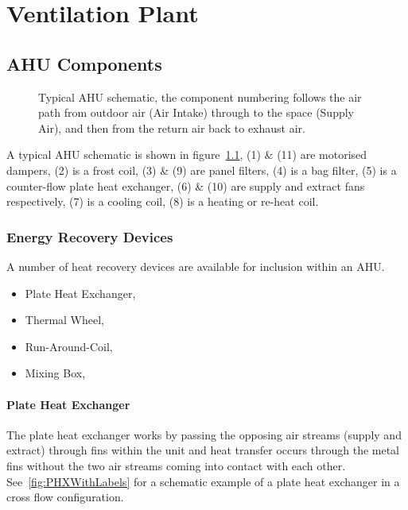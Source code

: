 \chapter{Ventilation Plant}
\label{chp:ventilationPlant}

\section{\gls{AHU} Components}
\label{sec:AHUComponents}

\begin{figure}[H]
\centering

\caption{Typical \gls{AHU} schematic, the component numbering follows the air path from outdoor air (Air Intake) through to the space (Supply Air), and then from the return air back to exhaust air.}
\label{fig:TypicalAHUSchematic}
\end{figure}

A typical \gls{AHU} schematic is shown in figure~\ref{fig:TypicalAHUSchematic}, (1) \& (11) are motorised dampers, (2) is a frost coil, (3) \& (9) are panel filters, (4) is a bag filter, (5) is a counter-flow plate heat exchanger, (6) \& (10) are supply and extract fans respectively, (7) is a cooling coil, (8) is a heating or re-heat coil.

\subsection{Energy Recovery Devices}

A number of heat recovery devices are available for inclusion within an \gls{AHU}.

\begin{itemize}
\item Plate Heat Exchanger,
\item Thermal Wheel,
\item Run-Around-Coil,
\item Mixing Box,
\end{itemize}

\subsubsection{Plate Heat Exchanger}

The plate heat exchanger works by passing the opposing air streams (supply and extract) through fins within the unit and heat transfer occurs through the metal fins without the two air streams coming into contact with each other.  See~\autoref{fig:PHXWithLabels} for a schematic example of a plate heat exchanger in a cross flow configuration.

